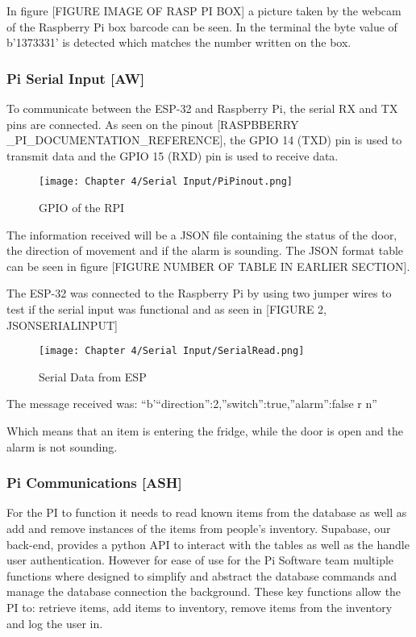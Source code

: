 In figure [FIGURE IMAGE OF RASP PI BOX] a picture taken by the webcam of the Raspberry Pi box barcode can be seen.
In the terminal the byte value of b'1373331' is detected which matches the number written on the box.

\subsubsection{Pi Serial Input [AW]}

To communicate between the ESP-32 and Raspberry Pi, the serial RX and TX pins are connected.
As seen on the pinout [RASPBBERRY \_PI\_DOCUMENTATION\_REFERENCE], the GPIO 14 (TXD) pin is used to transmit data and the GPIO 15 (RXD) pin is used to receive data.

\begin{figure}[H]        
    \centering
    \texttt{[image: Chapter 4/Serial Input/PiPinout.png]}
    \caption{GPIO of the RPI}
    \label{fig:rpigpio} 
\end{figure} 

The information received will be a JSON file containing the status of the door, the direction of movement and if the alarm is sounding.
The JSON format table can be seen in figure [FIGURE NUMBER OF TABLE IN EARLIER SECTION].

The ESP-32 was connected to the Raspberry Pi by using two jumper wires to test if the serial input was functional and as seen in [FIGURE 2, JSONSERIALINPUT]

\begin{figure}[H]        
    \centering
    \texttt{[image: Chapter 4/Serial Input/SerialRead.png]}
    \caption{Serial Data from ESP}
    \label{fig:rpiserial} 
\end{figure} 

The message received was: “b'{“direction”:2,”switch”:true,”alarm”:false} r n”

Which means that an item is entering the fridge, while the door is open and the alarm is not sounding.

\subsubsection{Pi Communications [ASH]}

For the PI to function it needs to read known items from the database as well as add and remove instances of the items from people's inventory.
Supabase, our back-end, provides a python API to interact with the tables as well as the handle user authentication.
However for ease of use for the Pi Software team multiple functions where designed to simplify and abstract the database commands and manage the database connection the background.
These key functions allow the PI to: retrieve items, add items to inventory, remove items from the inventory and log the user in.

